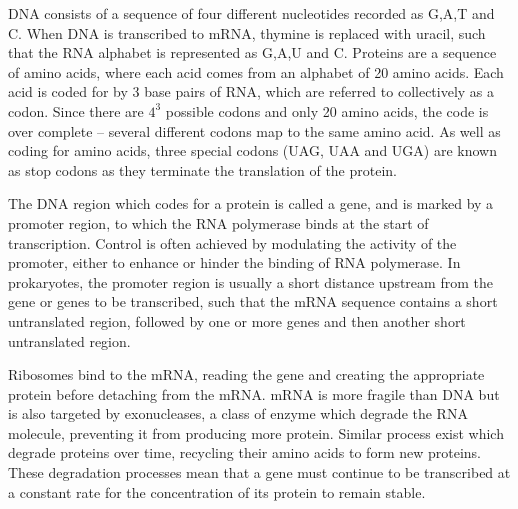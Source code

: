 \documentclass[twoside,a4paper]{article}
\begin{document}
\begin{multicols}{2}
DNA consists of a sequence of four different nucleotides recorded as G,A,T and C.
When DNA is transcribed to mRNA, thymine is replaced with uracil, such that the
RNA alphabet is represented as G,A,U and C.
Proteins are a sequence of amino acids, where each acid comes from an alphabet
of 20 amino acids.
Each acid is coded for by 3 base pairs of RNA, which are referred to
collectively as a codon.
Since there are $4^3$ possible codons and only 20 amino acids, the code is
over complete -- several different codons map to the same amino acid.
As well as coding for amino acids, three special codons (UAG, UAA and UGA) are
known as stop codons as they terminate the translation of the protein.

The DNA region which codes for a protein is called a gene, and is marked by a
promoter region, to which the RNA polymerase binds at the start of
transcription.
Control is often achieved by modulating the activity of the promoter, either to
enhance or hinder the binding of RNA polymerase.
In prokaryotes, the promoter region is usually a short distance upstream from
the gene or genes to be transcribed, such that the mRNA sequence contains a
short untranslated region, followed by one or more genes and then another short
untranslated region.

Ribosomes bind to the mRNA, reading the gene and creating the appropriate
protein before detaching from the mRNA.
mRNA is more fragile than DNA but is also targeted by exonucleases, a class of
enzyme which degrade the RNA molecule, preventing it from producing more
protein.
Similar process exist which degrade proteins over time, recycling their amino
acids to form new proteins.
These degradation processes mean that a gene must continue to be transcribed at
a constant rate for the concentration of its protein to remain stable.








\end{multicols}
\end{document}
